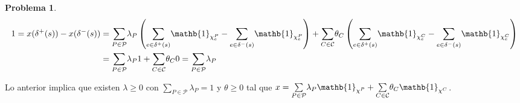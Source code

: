 \documentclass{article}
\theoremstyle{plain}
\theoremstyle{definition}
\newtheorem{prob}[teo]{Problema}
\theoremstyle{Azul}
\begin{document}
\begin{prob}
\begin{align*}
	1=x(\delta^{+}(s))-x(\delta^{-}(s)) & =\underset{P \in \mathcal{P}}{\sum}\lambda_{P}\left(\underset{e\in\delta^{+}(s)}{\sum}\mathb{1}_{\chi^{P}_{e}}-\underset{e\in\delta^{-}(s)}{\sum}\mathb{1}_{\chi^{P}_{e}}\right)+\underset{C \in \mathcal{C}}{\sum}\theta_{C}\left(\underset{e\in\delta^{+}(s)}{\sum}\mathb{1}_{\chi^{C}_{e}}-\underset{e\in\delta^{-}(s)}{\sum}\mathb{1}_{\chi^{C}_{e}}\right)\\
	&=\underset{P \in \mathcal{P}}{\sum}\lambda_{P}1+\underset{C \in \mathcal{C}}{\sum}\theta_{C}0=\underset{P \in \mathcal{P}}{\sum}\lambda_{P}
\end{align*}

Lo anterior implica que existen  $\lambda\geq0$ con $\underset{P\in\mathcal{P}}{\sum}\lambda_{P}=1$ y $\theta\geq0$ tal que $x=\underset{P \in \mathcal{P}}{\sum}\lambda_{P}\mathb{1}_{\chi^{P}}+\underset{C \in \mathcal{C}}{\sum}\theta_{C}\mathb{1}_{\chi^{C}}$.

\end{prob}
\end{document}
